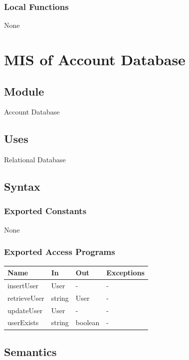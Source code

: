 \documentclass[12pt, titlepage]{article}
\begin{document}
\subsubsection{Local Functions}
None

\section{MIS of Account Database} \label{accd}

\subsection{Module}

Account Database

\subsection{Uses}

Relational Database

\subsection{Syntax}

\subsubsection{Exported Constants}
None
\subsubsection{Exported Access Programs}

\begin{center}
\begin{tabular}{p{2cm} p{4cm} p{4cm} p{2cm}}
\hline
\textbf{Name} & \textbf{In} & \textbf{Out} & \textbf{Exceptions} \\
\hline
insertUser & User & - & - \\
retrieveUser & string & User & - \\
updateUser & User & - & - \\
userExists & string & boolean & - \\
\hline
\end{tabular}
\end{center}

\subsection{Semantics}
\end{document}
